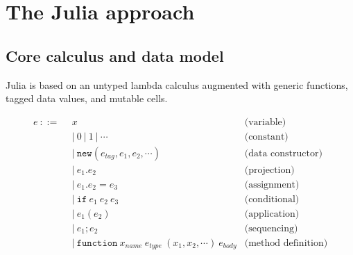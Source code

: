 \chapter{The Julia approach}

\section{Core calculus and data model}
\label{sec:corecalc}

Julia is based on an untyped lambda calculus augmented with generic functions,
tagged data values, and mutable cells.

\vspace{-3ex}
\begin{singlespace}
\begin{align*}
  e\ ::=\ &\ x                 & \textrm{(variable)} \\
        &\ |\ 0\ |\ 1\ |\ \cdots     & \textrm{(constant)} \\
        &\ |\ \texttt{new}(e_{tag}, e_1, e_2, \cdots) & \textrm{(data constructor)} \\
        &\ |\ e_1.e_2        & \textrm{(projection)} \\
        &\ |\ e_1.e_2 = e_3  & \textrm{(assignment)} \\
        &\ |\ \texttt{if}\ e_1\ e_2\ e_3 & \textrm{(conditional)} \\
        &\ |\ e_1(e_2)       & \textrm{(application)} \\
        &\ |\ e_1; e_2       & \textrm{(sequencing)} \\
        &\ |\ \texttt{function}\ x_{name}\ e_{type}\ (x_1, x_2, \cdots)\ e_{body} & \textrm{(method definition)}
\end{align*}
\end{singlespace}

